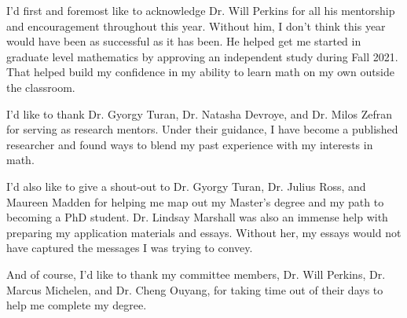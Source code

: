 \acknowledgment

I'd first and foremost like to acknowledge Dr. Will Perkins for all his mentorship and encouragement throughout this year. Without him, I don't think this year would have been as successful as it has been. He helped get me started in graduate level mathematics by approving an independent study during Fall 2021. That helped build my confidence in my ability to learn math on my own outside the classroom.

I'd like to thank Dr. Gyorgy Turan, Dr. Natasha Devroye, and Dr. Milos Zefran for serving as research mentors. Under their guidance, I have become a published researcher and found ways to blend my past experience with my interests in math.

I'd also like to give a shout-out to Dr. Gyorgy Turan, Dr. Julius Ross, and Maureen Madden for helping me map out my Master's degree and my path to becoming a PhD student. Dr. Lindsay Marshall was also an immense help with preparing my application materials and essays. Without her, my essays would not have captured the messages I was trying to convey.

And of course, I'd like to thank my committee members, Dr. Will Perkins, Dr. Marcus Michelen, and Dr. Cheng Ouyang, for taking time out of their days to help me complete my degree.

